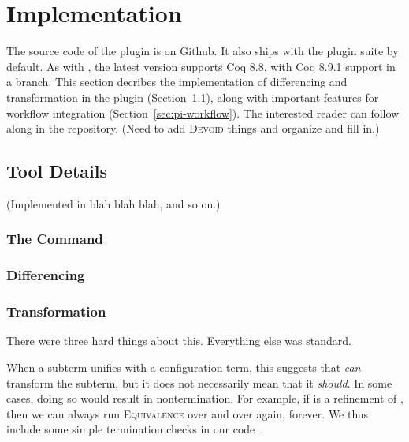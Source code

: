 \section{Implementation}
\label{sec:pi-implementation}

The source code of the \toolnamec plugin is on Github.
It also ships with the \sysnamelong plugin suite by default.
As with \sysname, the latest version supports Coq 8.8, with Coq 8.9.1 support in a branch.
This section decribes the implementation of differencing and transformation in the \toolnamec plugin (Section~\ref{sec:pi-details}),
along with important features for workflow integration (Section~\ref{sec:pi-workflow}).
The interested reader can follow along in the repository.
(Need to add \textsc{Devoid} things and organize and fill in.)

\subsection{Tool Details}
\label{sec:pi-details}

(Implemented in blah blah blah, and so on.)

\subsubsection{The Command}

\subsubsection{Differencing}

\subsubsection{Transformation}

There were three hard things about this.
Everything else was standard.

When a subterm unifies with a configuration term, this suggests that \toolnamec \textit{can}
transform the subterm, but it does not necessarily mean that it \textit{should}.
In some cases, doing so would result in nontermination.
For example, if \B is a refinement of \Aa, then we can always run \textsc{Equivalence}
over and over again, forever.
We thus include some simple termination checks in our code~\href{https://github.com/uwplse/pumpkin-pi/blob/v2.0.0/plugin/src/automation/lift/liftrules.ml}{}. %

